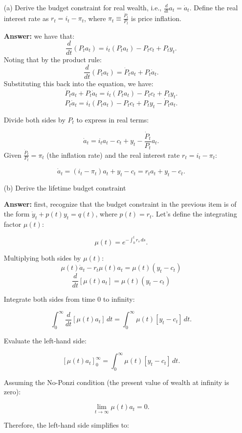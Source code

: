 \documentclass[11pt]{extarticle}
\theoremstyle{plain}
\theoremstyle{definition}
\begin{document}
\vspace{5mm}
\begin{enumerate}
\item [(a)] Derive the budget constraint for real wealth, i.e., $\frac{d}{dt} a_t = \dot a_t$. Define the real interest rate as $r_t = i_t - \pi_t$, where $\pi_t \equiv \frac{\dot P_t}{P_t}$ is price inflation.

\textbf{Answer: } we have that:
\[
\frac{d}{dt}(P_t a_t) = i_t (P_t a_t) - P_t c_t + P_t y_t.
\]
Noting that by the product rule:
\[
\frac{d}{dt}(P_t a_t) = \dot{P}_t a_t + P_t \dot{a}_t.
\]
Substituting this back into the equation, we have:
\[
\dot{P}_t a_t + P_t \dot{a}_t = i_t (P_t a_t) - P_t c_t + P_t y_t.
\]
\[
P_t \dot{a}_t = i_t (P_t a_t) - P_t c_t + P_t y_t - \dot{P}_t a_t.
\]

Divide both sides by \(P_t\) to express in real terms:

\[
\dot{a}_t = i_t a_t - c_t + y_t - \frac{\dot{P}_t}{P_t} a_t.
\]
Given \(\frac{\dot{P}_t}{P_t} = \pi_t\) (the inflation rate) and the real interest rate \(r_t = i_t - \pi_t\):

\[
\dot{a}_t = (i_t - \pi_t) a_t + y_t - c_t = r_t a_t + y_t - c_t.
\]
	
\item [(b)] Derive the lifetime budget constraint

\textbf{Answer:} first, recognize that the budget constraint in the previous item is of the form $\dot{y}_t + p(t)y_t = q(t)$, where $p(t)=r_t$. Let’s define the integrating factor \(\mu(t)\):

\[
\mu(t) = e^{ -\int_0^t r_s \, ds }.
\]

Multiplying both sides by $\mu(t)$:
$$\mu(t) \dot{a}_t - r_t \mu(t) a_t=\mu(t)(y_t-c_t)$$
\[
\frac{d}{dt} [ \mu(t) a_t ]=\mu(t)(y_t-c_t)
\]

Integrate both sides from time 0 to infinity:

\[
\int_0^\infty \frac{d}{dt} [ \mu(t) a_t ] \, dt = \int_0^\infty \mu(t) [ y_t - c_t ] \, dt.
\]

Evaluate the left-hand side:

\[
\left[ \mu(t) a_t \right]_0^\infty = \int_0^\infty \mu(t) [ y_t - c_t ] \, dt.
\]

Assuming the No-Ponzi condition (the present value of wealth at infinity is zero):

\[
\lim_{t \to \infty} \mu(t) a_t = 0.
\]

Therefore, the left-hand side simplifies to:


\end{enumerate}
\end{document}

